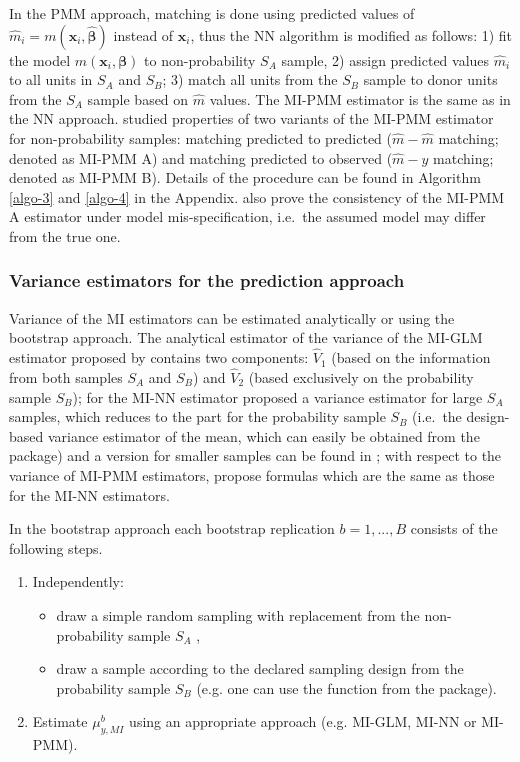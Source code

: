 \documentclass[
]{jss}
\begin{document}
In the PMM approach, matching is done using predicted values of
\(\hat{m}_i=m\left(\boldsymbol{x}_i, \hat{\boldsymbol{\beta}}\right)\)
instead of \(\boldsymbol{x}_i\), thus the NN algorithm is modified as
follows: 1) fit the model
\(m\left(\boldsymbol{x}_i, \boldsymbol{\beta}\right)\) to
non-probability \(S_A\) sample, 2) assign predicted values \(\hat{m}_i\)
to all units in \(S_A\) and \(S_B\); 3) match all units from the \(S_B\)
sample to donor units from the \(S_A\) sample based on \(\hat{m}\)
values. The MI-PMM estimator is the same as in the NN approach.
\citet{chlebicki2025} studied properties of two variants of the MI-PMM
estimator for non-probability samples: matching predicted to predicted
(\(\hat{m}-\hat{m}\) matching; denoted as MI-PMM A) and matching
predicted to observed (\(\hat{m}-y\) matching; denoted as MI-PMM B).
Details of the procedure can be found in Algorithm \ref{algo-3} and
\ref{algo-4} in the Appendix. \citet{chlebicki2025} also prove the
consistency of the MI-PMM A estimator under model mis-specification,
i.e.~the assumed model may differ from the true one.

\subsubsection{Variance estimators for the prediction
approach}\label{variance-estimators-for-the-prediction-approach}

Variance of the MI estimators can be estimated analytically or using the
bootstrap approach. The analytical estimator of the variance of the
MI-GLM estimator proposed by \citet[p. 950]{kim_combining_2021} contains
two components: \(\hat{V}_1\) (based on the information from both
samples \(S_A\) and \(S_B\)) and \(\hat{V}_2\) (based exclusively on the
probability sample \(S_B\)); for the MI-NN estimator
\citet{yang2021integration} proposed a variance estimator for large
\(S_A\) samples, which reduces to the part for the probability sample
\(S_B\) (i.e.~the design-based variance estimator of the mean, which can
easily be obtained from the  package) and a version for
smaller samples can be found in \citet{chlebicki2025}; with respect to
the variance of MI-PMM estimators, \citet{chlebicki2025} propose
formulas which are the same as those for the MI-NN estimators.

In the bootstrap approach each bootstrap replication \(b=1,...,B\)
consists of the following steps.

\begin{enumerate}
\item Independently:
  \begin{itemize}
  \item draw a simple random sampling with replacement from the non-probability sample $S_A$ ,
  \item draw a sample according to the declared sampling design from the probability sample $S_B$ (e.g. one can use the  function from the  package).
  \end{itemize}
\item Estimate $\mu_{y, MI}^b$ using an appropriate approach (e.g. MI-GLM, MI-NN or MI-PMM).
\end{enumerate}
\end{document}
